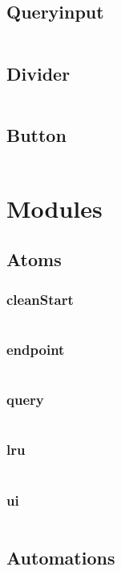 \subsection{Queryinput}
\label{sec:Queryinput.tsx}
\inputminted{tsx}{figures/snippets/src/components/Queryinput.tsx}
\subsection{Divider}
\label{sec:Divider.tsx}
\inputminted{tsx}{figures/snippets/src/components/Divider.tsx}
\subsection{Button}
\label{sec:Button.tsx}
\inputminted{tsx}{figures/snippets/src/components/Button.tsx}

\section{Modules}
\subsection{Atoms}
\subsubsection{cleanStart}
\label{sec:cleanStart.ts}
\inputminted{ts}{figures/snippets/src/modules/atoms/cleanStart.ts}
\subsubsection{endpoint}
\label{sec:endpoint.ts}
\inputminted{ts}{figures/snippets/src/modules/atoms/endpoint.ts}
\subsubsection{query}
\label{sec:query.ts}
\inputminted{ts}{figures/snippets/src/modules/atoms/query.ts}
\subsubsection{lru}
\label{sec:lru.ts}
\inputminted{ts}{figures/snippets/src/modules/atoms/lru.ts}
\subsubsection{ui}
\label{sec:ui.ts}
\inputminted{ts}{figures/snippets/src/modules/atoms/ui.ts}
\subsection{Automations}
